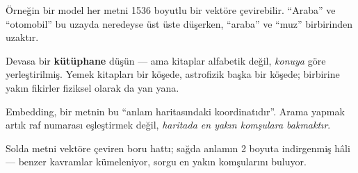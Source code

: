 Örneğin bir model her metni 1536 boyutlu bir vektöre çevirebilir. ``Araba'' ve
``otomobil'' bu uzayda neredeyse üst üste düşerken, ``araba'' ve ``muz''
birbirinden uzaktır.

\begin{mentalbox}
Devasa bir \textbf{kütüphane} düşün --- ama kitaplar alfabetik değil,
\emph{konuya} göre yerleştirilmiş. Yemek kitapları bir köşede, astrofizik başka
bir köşede; birbirine yakın fikirler fiziksel olarak da yan yana.

\smallskip
Embedding, bir metnin bu ``anlam haritasındaki koordinatıdır''. Arama yapmak
artık raf numarası eşleştirmek değil, \emph{haritada en yakın komşulara bakmaktır}.
\end{mentalbox}

Solda metni vektöre çeviren boru hattı; sağda anlamın 2 boyuta indirgenmiş hâli ---
benzer kavramlar kümeleniyor, sorgu en yakın komşularını buluyor.

